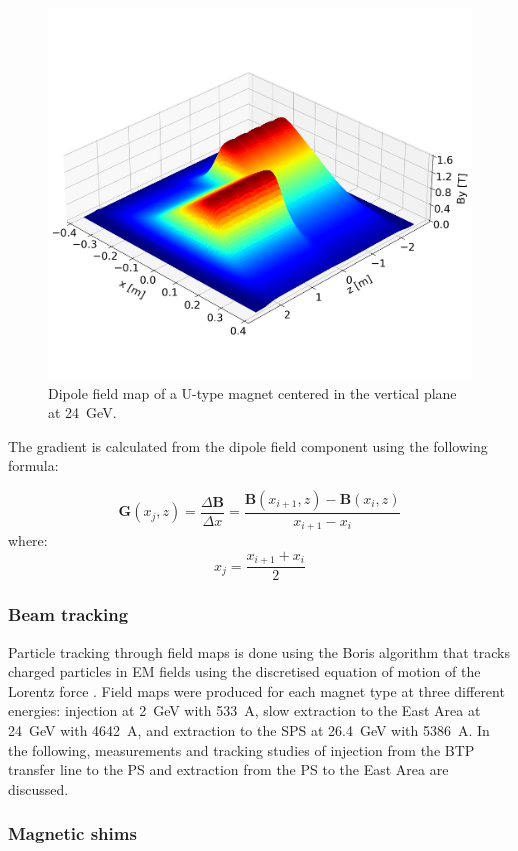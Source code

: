 \begin{figure}[!htb]
   \centering
   \includegraphics*[width=0.7\columnwidth, trim={0 2.9cm 0 4.3cm},clip]{01_Introduction/images/dipole_field.png}
   \caption{Dipole field map of a U-type magnet centered in the vertical plane at \SI{24}{GeV}.}
   \label{fig:dipole_field}
\end{figure}

The gradient is calculated from the dipole field component using the following formula:
 
$$ \boldsymbol{G}(x_{j},z) = \frac{\Delta\boldsymbol{B}}{\Delta x} = \frac{\boldsymbol{B}(x_{i+1},z) - \boldsymbol{B}(x_{i},z)}{x_{i+1}-x_{i}} $$
where:
$$ x_{j} = \frac{x_{i+1} + x_{i}}{{2}} $$

\subsubsection{Beam tracking}

Particle tracking through field maps is done using the Boris algorithm that tracks charged particles in EM fields using the discretised equation of motion of the Lorentz force \cite{dutheil_pybttrackersborispy_nodate,qin_why_2013,ripperda_comprehensive_2018}. Field maps were produced for each magnet type at three different energies: injection at \SI{2}{GeV} with \SI{533}{A}, slow extraction to the East Area at \SI{24}{GeV} with \SI{4642}{A}, and extraction to the SPS at \SI{26.4}{GeV} with \SI{5386}{A}. In the following, measurements and tracking studies of injection from the BTP transfer line to the PS and extraction from the PS to the East Area are discussed.


\subsubsection{Magnetic shims}

